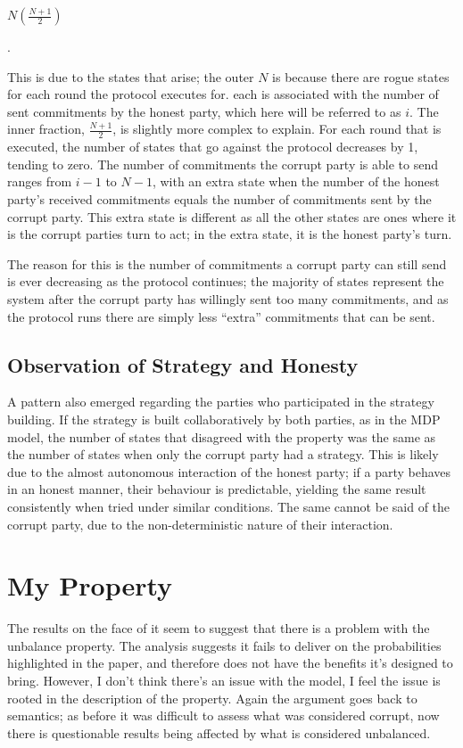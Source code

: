 \documentclass{l4proj}
\begin{document}
\centerline{$N\left ( \frac{N + 1}{2} \right )$}.

This is due to the states that arise; the outer $N$ is because there are rogue states for each round the protocol executes for. each is associated with the number of sent commitments by the honest party, which here will be referred to as $i$. The inner fraction, $\frac{N + 1}{2}$, is slightly more complex to explain. For each round that is executed, the number of states that go against the protocol decreases by 1, tending to zero. The number of commitments the corrupt party is able to send ranges from $i-1$ to $N-1$, with an extra state when the number of the honest party's received commitments equals the number of commitments sent by the corrupt party. This extra state is different as all the other states are ones where it is the corrupt parties turn to act; in the extra state, it is the honest party's turn.

The reason for this is the number of commitments a corrupt party can still send is ever decreasing as the protocol continues; the majority of states represent the system after the corrupt party has willingly sent too many commitments, and as the protocol runs there are simply less ``extra'' commitments that can be sent.

\subsection{Observation of Strategy and Honesty}

A pattern also emerged regarding the parties who participated in the strategy building. If the strategy is built collaboratively by both parties, as in the MDP model, the number of states that disagreed with the property was the same as the number of states when only the corrupt party had a strategy. This is likely due to the almost autonomous interaction of the honest party; if a party behaves in an honest manner, their behaviour is predictable, yielding the same result consistently when tried under similar conditions. The same cannot be said of the corrupt party, due to the non-deterministic nature of their interaction.

\section{My Property}

The results on the face of it seem to suggest that there is a problem with the unbalance property. The analysis suggests it fails to deliver on the probabilities highlighted in the paper, and therefore does not have the benefits it's designed to bring. However, I don't think there's an issue with the model, I feel the issue is rooted in the description of the property. Again the argument goes back to semantics; as before it was difficult to assess what was considered corrupt, now there is questionable results being affected by what is considered unbalanced. 
\end{document}
